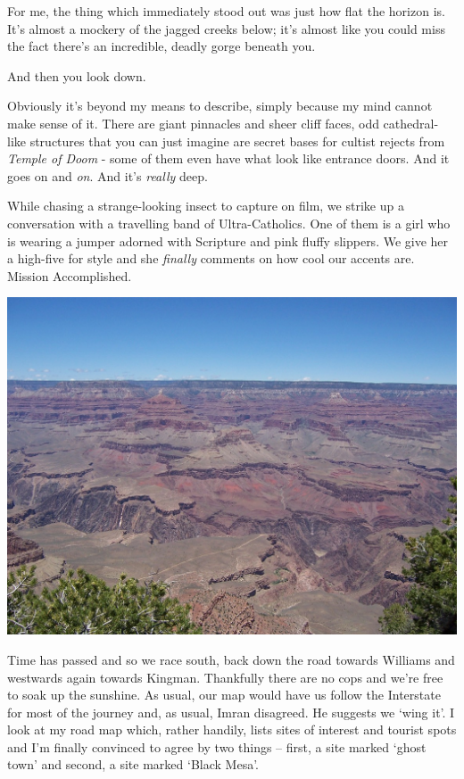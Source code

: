 \documentclass[a5paper,titlepage,11pt]{book}
\begin{document}
For me, the thing which immediately stood out was just how flat the horizon is. It's almost a mockery of the jagged creeks below; it's almost like you could miss the fact there's an incredible, deadly gorge beneath you.

And then you look down.

Obviously it's beyond my means to describe, simply because my mind cannot make sense of it. There are giant pinnacles and sheer cliff faces, odd cathedral-like structures that you can just imagine are secret bases for cultist rejects from \emph{Temple of Doom} - some of them even have what look like entrance doors. And it goes on and \emph{on}. And it's \emph{really} deep.

While chasing a strange-looking insect to capture on film, we strike up a conversation with a travelling band of Ultra-Catholics. One of them is a girl who is wearing a jumper adorned with Scripture and pink fluffy slippers. We give her a high-five for style and she \emph{finally} comments on how cool our accents are. Mission Accomplished.

\begin{center}\includegraphics[width=\textwidth]{gfx/100_1458}\end{center}

Time has passed and so we race south, back down the road towards Williams and westwards again towards Kingman. Thankfully there are no cops and we're free to soak up the sunshine. As usual, our map would have us follow the Interstate for most of the journey and, as usual, Imran disagreed. He suggests we `wing it'. I look at my road map which, rather handily, lists sites of interest and tourist spots and I'm finally convinced to agree by two things -- first, a site marked `ghost town' and second, a site marked `Black Mesa'.
\end{document}

